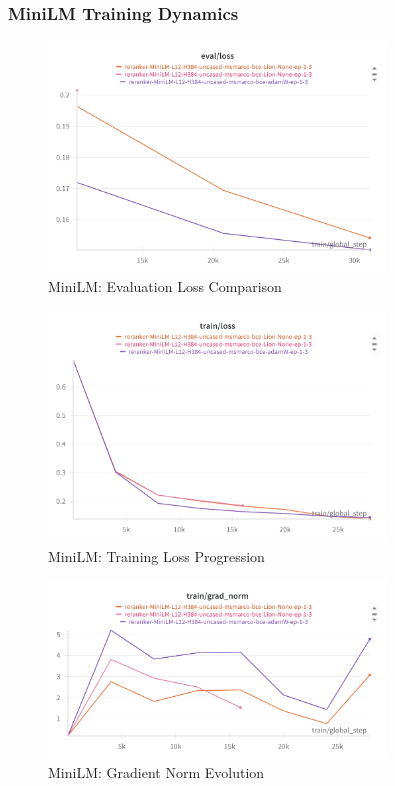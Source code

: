 \subsubsection{MiniLM Training Dynamics}

\begin{figure}[H]
    \centering
    \includegraphics[width=0.8\textwidth]{Figures/microsoft_MiniLM-L12-H384-uncased_adamW_v_Lion_eval_loss.png}
    \caption{MiniLM: Evaluation Loss Comparison}
    \label{fig:minilm_eval_loss}
\end{figure}

\begin{figure}[H]
    \centering
    \includegraphics[width=0.8\textwidth]{Figures/microsoft_MiniLM-L12-H384-uncased_adamW_v_Lion_train_loss.png}
    \caption{MiniLM: Training Loss Progression}
    \label{fig:minilm_train_loss}
\end{figure}

\begin{figure}[H]
    \centering
    \includegraphics[width=0.8\textwidth]{Figures/microsoft_MiniLM-L12-H384-uncased_adamW_v_Lion_grad_norm.png}
    \caption{MiniLM: Gradient Norm Evolution}
    \label{fig:minilm_grad_norm}
\end{figure}

